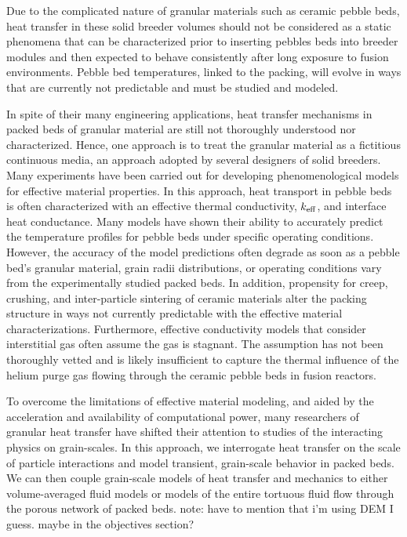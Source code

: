 Due to the complicated nature of granular materials such as ceramic pebble beds, heat transfer in these solid breeder volumes should not be considered as a static phenomena that can be characterized prior to inserting pebbles beds into breeder modules and then expected to behave consistently after long exposure to fusion environments. Pebble bed temperatures, linked to the packing, will evolve in ways that are currently not predictable and must be studied and modeled.

In spite of their many engineering applications, heat transfer mechanisms in packed beds of granular material are still not thoroughly understood nor characterized. Hence, one approach is to treat the granular material as a fictitious continuous media, an approach adopted by several designers of solid breeders. Many experiments have been carried out for developing phenomenological models for effective material properties. In this approach, heat transport in pebble beds is often characterized with an effective thermal conductivity, $k_\text{eff}$, and interface heat conductance. Many models have shown their ability to accurately predict the temperature profiles for pebble beds under specific operating conditions. However, the accuracy of the model predictions often degrade as soon as a pebble bed's granular material, grain radii distributions, or operating conditions vary from the experimentally studied packed beds. In addition, propensity for creep, crushing, and inter-particle sintering of ceramic materials alter the packing structure in ways not currently predictable with the effective material characterizations. Furthermore, effective conductivity models that consider interstitial gas often assume the gas is stagnant. The assumption has not been thoroughly vetted and is likely insufficient to capture the thermal influence of the helium purge gas flowing through the ceramic pebble beds in fusion reactors.

To overcome the limitations of effective material modeling, and aided by the acceleration and availability of computational power, many researchers of granular heat transfer have shifted their attention to studies of the interacting physics on grain-scales. In this approach, we interrogate heat transfer on the scale of particle interactions and model transient, grain-scale behavior in packed beds. We can then couple grain-scale models of heat transfer and mechanics to either volume-averaged fluid models or models of the entire tortuous fluid flow through the porous network of packed beds.
note: have to mention that i'm using DEM I guess. maybe in the objectives section?

